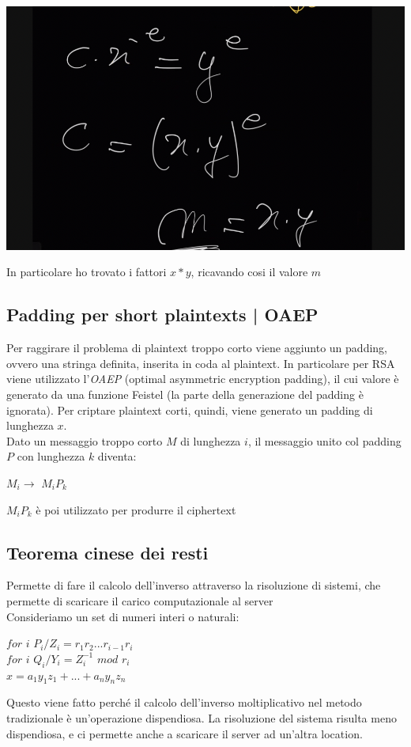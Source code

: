 \documentclass[11pt, oneside]{article}   	%
\begin{document}
\begin{center}
\includegraphics[scale= 0.4]{m2}
\end{center}
In particolare ho trovato i fattori $x * y$, ricavando cosi il valore $m$

\subsection*{Padding per short plaintexts | OAEP}
Per raggirare il problema di plaintext troppo corto viene aggiunto un padding, ovvero una stringa definita, inserita in coda al plaintext. In particolare per RSA viene utilizzato l'\emph{OAEP} (optimal asymmetric encryption padding), il cui valore è generato da una funzione Feistel (la parte della generazione del padding è ignorata). Per criptare plaintext corti, quindi, viene generato un padding di lunghezza $x$.\\
Dato un messaggio troppo corto $M$ di lunghezza $i$, il messaggio unito col padding $P$ con lunghezza $k$ diventa:	\begin{center}
$M_i \rightarrow$ $M_iP_k$

\end{center}
$M_iP_k$ è poi utilizzato per produrre il ciphertext


\subsection*{Teorema cinese dei resti}
Permette di fare il calcolo dell'inverso attraverso la risoluzione di sistemi, che permette di scaricare il carico computazionale al server\\
Consideriamo un set di numeri interi o naturali:
\begin{center}
$for$ $i$ 	$P_i/Z_i = r_1r_2...r_{i-1}r_{i}$\\
$for$ $i$ 	$Q_i/Y_i = Z^{-1}_i$ $mod$ $r_i$\\
$x = a_1y_1z_1+ ... + a_ny_nz_n$\\
\end{center}
Questo viene fatto perché il calcolo dell'inverso moltiplicativo nel metodo tradizionale è un'operazione dispendiosa. La risoluzione del sistema risulta meno dispendiosa, e ci permette anche a scaricare il server ad un'altra location.
\end{document}
